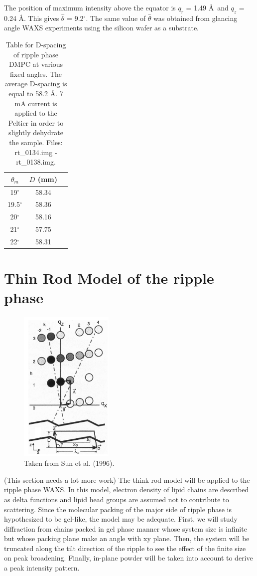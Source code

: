 \documentclass[letterpaper,12pt]{article}
\newcommand{\dg}{$^{\circ}$}%
\newcommand{\motor}{$\theta_m$}%
\begin{document}
The position of maximum intensity above the equator is $q_r$ = 1.49 \AA\ and $q_z$ = 0.24 \AA. This gives $\hat{\theta}$ = 9.2\dg. The same value of $\hat{\theta}$ was obtained from glancing angle WAXS experiments using the silicon wafer as a substrate. 
\begin{table}[htbp]
	\centering
	\begin{tabular}{c|cc}
			\hline		
			\motor	& $D$	(mm)	\\ \hline
			19\dg 	& 58.34  		\\
			19.5\dg 	& 58.36 	\\
			20\dg  & 58.16 	 	\\
			21\dg  & 57.75   	\\
			22\dg 	& 58.31 	\\
			\hline
	\end{tabular}
	\caption[D-spacing of ripple phase DMPC at various fixed angles]{Table for D-spacing of ripple phase DMPC at various fixed angles. The average D-spacing is equal to 58.2 \AA. 7 mA current is applied to the Peltier in order to slightly dehydrate the sample. Files: rt\_0134.img - rt\_0138.img.}
	\label{tab:RippleDspace}
\end{table}

\newpage
\section{Thin Rod Model of the ripple phase}
\begin{figure}
	\centering
	\includegraphics[width=0.4\textwidth]{Sun1996}
	\caption{Taken from Sun et al. (1996).}
	\label{fig:Sun1996}
\end{figure}
(This section needs a lot more work) The think rod model will be applied to the ripple phase WAXS. In this model, electron density of lipid chains are described as delta functions and lipid head groups are assumed not to contribute to scattering. Since the molecular packing of the major side of ripple phase is hypothesized to be gel-like, the model may be adequate. First, we will study diffraction from chains packed in gel phase manner whose system size is infinite but whose packing plane make an angle with xy plane. Then, the system will be truncated along the tilt direction of the ripple to see the effect of the finite size on peak broadening. Finally, in-plane powder will be taken into account to derive a peak intensity pattern.
\end{document}
